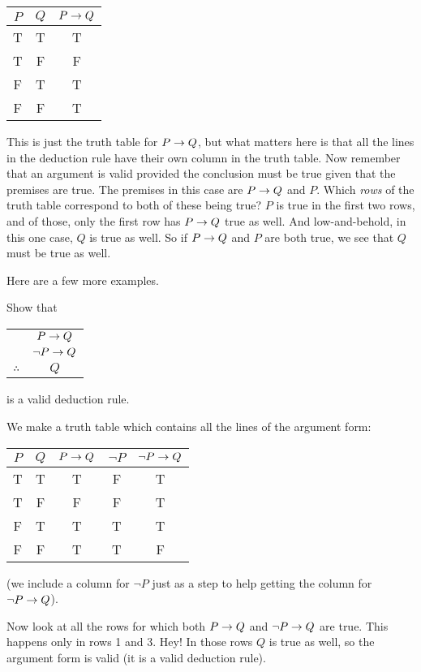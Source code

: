 \documentclass[12pt]{article}
\begin{document}
\begin{center}
 \begin{tabular}{c|c||c}
  $P$ & $Q$ & $P\rightarrow Q$ \\ \hline
  T & T & T \\
  T & F & F \\
  F & T & T \\
  F & F & T
 \end{tabular}
\end{center}

This is just the truth table for $P \rightarrow Q$, but what matters here is that all the lines in the deduction rule have their own column in the truth table.  Now remember that an argument is valid provided the conclusion must be true given that the premises are true.  The premises in this case are $P \rightarrow Q$ and $P$.  Which {\em rows} of the truth table correspond to both of these being true?  $P$ is true in the first two rows, and of those, only the first row has $P \rightarrow Q$ true as well.   And low-and-behold, in this one case, $Q$ is true as well.  So if $P\rightarrow Q$ and $P$ are both true, we see that $Q$ must be true as well.

Here are a few more examples.

\begin{example}
 Show that 
 \begin{center}
  \begin{tabular}{rc}
   & $P \rightarrow Q$\\
   & $\neg P \rightarrow Q$ \\ \hline
   $\therefore$ & $Q$
  \end{tabular}
 \end{center}
is a valid deduction rule.

\begin{solution}
 We make a truth table which contains all the lines of the argument form:
 \begin{center}
  \begin{tabular}{c|c||c|c|c}
   $P$ & $Q$ & $P\rightarrow Q$ & $\neg P$ & $\neg P \rightarrow Q$ \\ \hline
   T & T & T & F & T \\ 
   T & F & F & F & T \\
   F & T & T & T & T \\
   F & F & T & T & F 
  \end{tabular}
 \end{center}
(we include a column for $\neg P$ just as a step to help getting the column for $\neg P \rightarrow Q$). 

Now look at all the rows for which both $P \rightarrow Q$ and $\neg P \rightarrow Q$ are true.  This happens only in rows 1 and 3.  Hey! In those rows $Q$ is true as well, so the argument form is valid (it is a valid deduction rule).
\end{solution}

\end{example}
\end{document}
